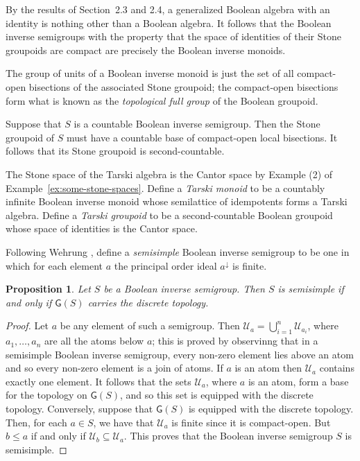 \documentclass[a4paper]{amsart}
\newtheorem{proposition}[theorem]{Proposition}
\begin{document}
By the results of Section~2.3 and 2.4,
a generalized Boolean algebra with an identity is nothing other than a Boolean algebra.
It follows that the Boolean inverse semigroups with the property 
that the space of identities of their Stone groupoids are compact are precisely the Boolean inverse monoids.

The group of units of a Boolean inverse monoid is just the set of all compact-open bisections of the associated Stone groupoid;
the compact-open bisections form what is known as the {\em topological full group} of the Boolean groupoid.

Suppose that $S$ is a countable Boolean inverse semigroup.
Then the Stone groupoid of $S$ must have a countable base of compact-open local bisections.
It follows that its Stone groupoid is second-countable.

The Stone space of the Tarski algebra is the Cantor space by Example (2) of Example~\ref{ex:some-stone-spaces}.
Define a {\em Tarski monoid} to be a countably infinite Boolean inverse monoid
whose semilattice of idempotents forms a Tarski algebra.
Define a {\em Tarski groupoid} to be a second-countable Boolean groupoid whose space of identities is the Cantor space.

Following Wehrung \cite{W}, 
define a {\em semisimple} Boolean inverse semigroup to be one 
in which for each element $a$ the principal order ideal $a^{\downarrow}$
is finite. 

\begin{proposition}\label{prop:semisimple} Let $S$ be a Boolean inverse semigroup.
Then $S$ is semisimple if and only if $\mathsf{G}(S)$ carries the discrete topology.
\end{proposition}
\begin{proof} Let $a$ be any element of such a semigroup.
Then $\mathscr{U}_{a} = \bigcup_{i=1}^{n} \mathscr{U}_{a_{i}}$, where $a_{1}, \ldots, a_{n}$ are all the atoms below $a$;
this is proved by observinng that in a semisimple Boolean inverse semigroup,
every non-zero element lies above an atom and so every non-zero element is a join of atoms.
If $a$ is an atom then $\mathscr{U}_{a}$ contains exactly one element.
It follows that the sets $\mathscr{U}_{a}$, where $a$ is an atom, form a base for the topology on $\mathsf{G}(S)$,
and so this set is equipped with the discrete topology.
Conversely, suppose that $\mathsf{G}(S)$ is equipped with the discrete topology.
Then, for each $a \in S$, we have that $\mathscr{U}_{a}$ is finite since it is compact-open.
But $b \leq a$ if and only if $\mathscr{U}_{b} \subseteq \mathscr{U}_{a}$.
This proves that the Boolean inverse semigroup $S$ is semisimple.
\end{proof}
\end{document}
